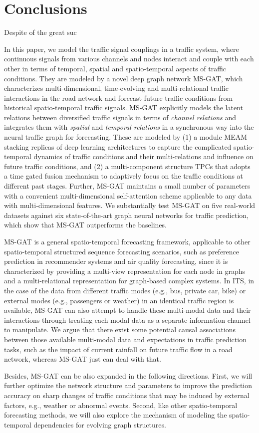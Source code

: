 \section{Conclusions}
Despite of the great suc

In this paper, we model the traffic signal couplings in a traffic system, where continuous signals from various channels and nodes interact and couple with each other in terms of temporal, spatial and spatio-temporal aspects of traffic conditions. They are modeled by a novel deep graph network MS-GAT, which characterizes multi-dimensional, time-evolving and multi-relational traffic interactions in the road network and forecast future traffic conditions from historical spatio-temporal traffic signals. MS-GAT explicitly models the latent relations between diversified traffic signals in terms of \textit{channel relations} and integrates them  with \textit{spatial} and \textit{temporal relations} in a synchronous way into the neural traffic graph for forecasting. These are modeled by (1) a module MEAM stacking replicas of deep learning architectures to capture the complicated spatio-temporal dynamics of traffic conditions and their multi-relations and influence on future traffic conditions, and (2) a multi-component structure TPCs that adopts a time gated fusion mechanism to adaptively focus on the traffic conditions at different past stages. Further, MS-GAT maintains a small number of parameters with a convenient multi-dimensional self-attention scheme applicable to any data with multi-dimensional features. We substantially test MS-GAT on five real-world datasets against six state-of-the-art graph neural networks for traffic prediction, which show that MS-GAT outperforms the baselines. 

MS-GAT is a general spatio-temporal forecasting framework, applicable to other spatio-temporal structured sequence forecasting scenarios, such as preference prediction in recommender systems and air quality forecasting, since it is characterized by providing a multi-view representation for each node in graphs and a multi-relational representation for graph-based complex systems. In ITS, in the case of the data from different traffic modes (e.g., bus, private car, bike) or external modes (e.g., passengers or weather) in an identical traffic region is available, MS-GAT can also attempt to handle these multi-modal data and their interactions through treating each modal data as a separate information channel to manipulate. We argue that there exist some potential causal associations between those available multi-modal data and expectations in traffic prediction tasks, such as the impact of current rainfall on future traffic flow in a road network, whereas MS-GAT just can deal with that. 

Besides, MS-GAT can be also expanded in the following directions. First, we will further optimize the network structure and parameters to improve the prediction accuracy on sharp changes of traffic conditions that may be induced by external factors, e.g., weather or abnormal events. Second, like other spatio-temporal forecasting methods, we will also explore the mechanism of modeling the spatio-temporal dependencies for evolving graph structures.
